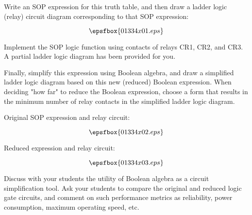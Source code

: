 

Write an SOP expression for this truth table, and then draw a ladder logic (relay) circuit diagram corresponding to that SOP expression:

$$\epsfbox{01334x01.eps}$$

Implement the SOP logic function using contacts of relays CR1, CR2, and CR3.  A partial ladder logic diagram has been provided for you.

Finally, simplify this expression using Boolean algebra, and draw a simplified ladder logic diagram based on this new (reduced) Boolean expression.  When deciding "how far" to reduce the Boolean expression, choose a form that results in the minimum number of relay contacts in the simplified ladder logic diagram.







Original SOP expression and relay circuit:

$$\epsfbox{01334x02.eps}$$

\vskip 10pt

Reduced expression and relay circuit:

$$\epsfbox{01334x03.eps}$$







Discuss with your students the utility of Boolean algebra as a circuit simplification tool.  Ask your students to compare the original and reduced logic gate circuits, and comment on such performance metrics as reliability, power consumption, maximum operating speed, etc.




